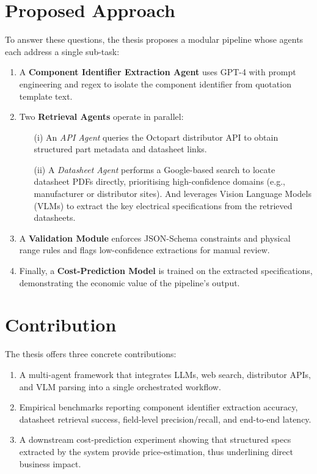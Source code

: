 \section{Proposed Approach }
To answer these questions, the thesis proposes a modular pipeline whose agents each address a single sub-task:  
\begin{enumerate}
  \item A \textbf{Component Identifier Extraction Agent} uses GPT-4 with prompt engineering and regex to isolate the component identifier from quotation template text.  
  \item Two \textbf{Retrieval Agents} operate in parallel:
    \begin{itemize}
      \item[(i)] An \emph{API Agent} queries the Octopart distributor API to obtain structured part metadata and datasheet links.
      \item[(ii)] A \emph{Datasheet Agent} performs a Google-based search to locate datasheet PDFs directly, prioritising high-confidence domains (e.g., manufacturer or distributor sites). And leverages Vision Language Models (VLMs) to extract the key electrical specifications from the retrieved datasheets.
    \end{itemize}
  \item A \textbf{Validation Module} enforces JSON-Schema constraints and physical range rules and flags low-confidence extractions for manual review.  
  \item Finally, a \textbf{Cost-Prediction Model} is trained on the extracted specifications, demonstrating the economic value of the pipeline's output.
\end{enumerate}

\section{Contribution }
The thesis offers three concrete contributions:
\begin{enumerate}
  \item A multi-agent framework that integrates LLMs, web search, distributor APIs, and VLM parsing into a single orchestrated workflow.  
  \item Empirical benchmarks reporting component identifier extraction accuracy, datasheet retrieval success, field-level precision/recall, and end-to-end latency.  
  \item A downstream cost-prediction experiment showing that structured specs extracted by the system provide price-estimation, thus underlining direct business impact.
\end{enumerate}

